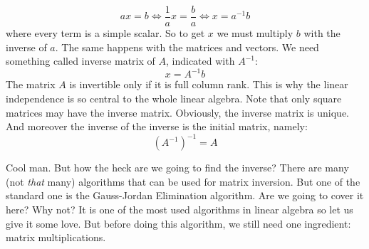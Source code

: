 \documentclass[computationalMathematics.tex]{subfiles}
\begin{document}
\[
    a x = b \iff \frac{1}{a} x = \frac{b}{a} \iff x = a^{-1} b
\]
where every term is a simple scalar. So to get $x$ we must multiply $b$ with the inverse of $a$. The same happens with the matrices and vectors. We need something called inverse matrix of $A$, indicated with $A^{-1}$:
\[
    x = A^{-1} b
\]
The matrix $A$ is invertible only if it is full column rank. This is why the linear independence is so central to the whole linear algebra. Note that only square matrices may have the inverse matrix. Obviously, the inverse matrix is unique. And moreover the inverse of the inverse is the initial matrix, namely:
\[
    (A^{-1})^{-1} = A
\]
\par Cool man. But how the heck are we going to find the inverse? There are many (not \textit{that} many) algorithms that can be used for matrix inversion. But one of the standard one is the Gauss-Jordan Elimination algorithm. Are we going to cover it here? Why not? It is one of the most used algorithms in linear algebra so let us give it some love. But before doing this algorithm, we still need one ingredient: matrix multiplications.
\end{document}
